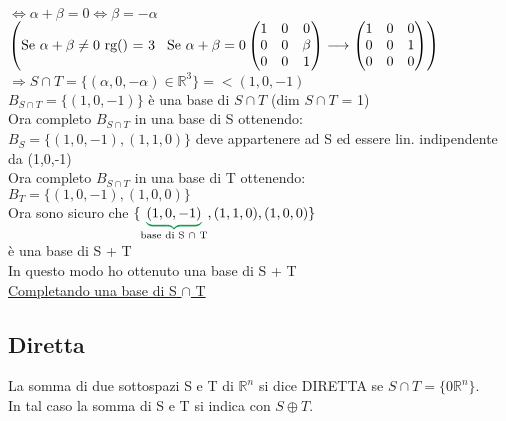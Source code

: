 \)\\
$\Leftrightarrow \alpha + \beta = 0 \Leftrightarrow \beta = -\alpha $\\
\(
\left(
\text{Se $\alpha + \beta \neq 0 $ rg() = 3}\hspace{0.3cm}
\text{Se } \alpha + \beta = 0
\begin{pmatrix}
	1 & 0 & 0 \\
	0 & 0 & \beta \\
	0 & 0 & 1 \\
\end{pmatrix}
\longrightarrow
\begin{pmatrix}
	1 & 0 & 0 \\
	0 & 0 & 1 \\
	0 & 0 & 0 \\
\end{pmatrix}
\right)
\)\\
$\Rightarrow S \cap T = \{ (\alpha, 0, -\alpha) \in \mathbb{R}^3\} = <(1,0,-1)$\\
\newpage
$B_{S \cap T} = \{ (1,0,-1)\}$ \textsf{\small è una base di $S \cap T$ (dim $S \cap T$ = 1)}\\
\textsf{\small Ora completo $B_{S \cap T}$ in una base di S ottenendo: }\\
$B_S = \{ (1,0,-1),(1,1,0)\}$ \textsf{\small deve appartenere ad S ed essere lin. indipendente da (1,0,-1)}\\
\textsf{\small Ora completo $B_{S \cap T}$ in una base di T ottenendo: }\\
$B_T = \{ (1,0,-1),(1,0,0)\}$\\
\textsf{\small Ora sono sicuro che $\{ \color{ForestGreen}\underbrace{\normalcolor(1,0,-1)} _{\normalcolor\text{base di S $\cap$ T}} \normalcolor, (1,1,0), (1,0,0)\}$}\\
\textsf{\small è una base di S + T}\\
\textsf{\small In questo modo ho ottenuto una base di S + T}\\
\textsf{\small \color{ForestGreen}\underline{\normalcolor Completando una base di S $\cap$ T}\normalcolor}\\


\subsection{Diretta}

\begin{definition}[Diretta]
	La somma di due sottospazi S e T di $\mathbb{R}^n$ si dice DIRETTA se \color{ForestGreen}\underline{\normalcolor $S \cap T = \{ 0\mathbb{R}^n\}$}.\\
	\normalcolor In tal caso la somma di S e T si indica con $S \oplus T$.
\end{definition}

